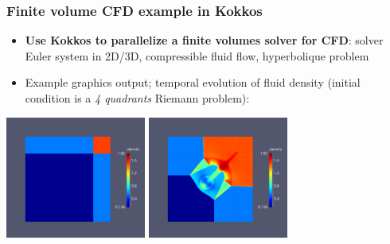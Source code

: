 \begin{frame}
  \frametitle{Finite volume CFD example in Kokkos}
  
  \begin{itemize}
  \item \textbf{Use Kokkos to parallelize a finite volumes solver for CFD}: solver Euler system in 2D/3D, compressible fluid flow, hyperbolique problem
  \item Example graphics output; temporal evolution of fluid density (initial condition is a \textit{4 quadrants} Riemann problem):
  \end{itemize}
  \begin{center}
    \includegraphics[height=4cm]{images/riemann/riemann_1}
    \hspace{0.1cm}
    \includegraphics[height=4cm]{images/riemann/riemann_2}
  \end{center}
\end{frame}


